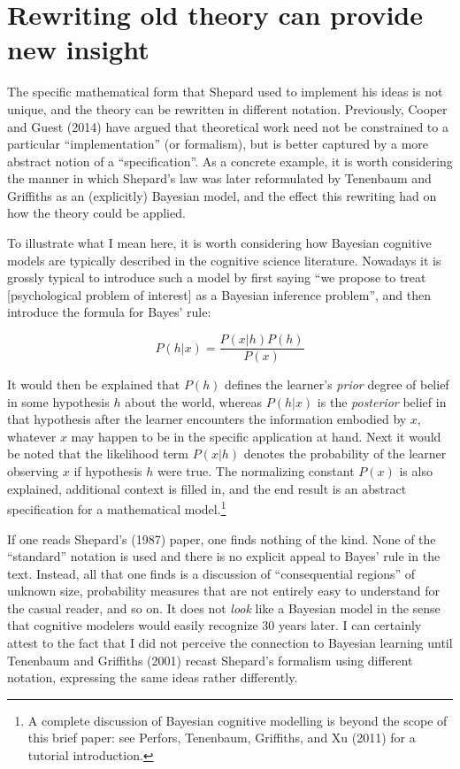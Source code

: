 \documentclass[
  english,
  doc]{apa6}
\begin{document}
\hypertarget{rewriting-old-theory-can-provide-new-insight}{%
\section{Rewriting old theory can provide new insight}\label{rewriting-old-theory-can-provide-new-insight}}

\noindent
The specific mathematical form that Shepard used to implement his ideas is not unique, and the theory can be rewritten in different notation. Previously, Cooper and Guest (2014) have argued that theoretical work need not be constrained to a particular \enquote{implementation} (or formalism), but is better captured by a more abstract notion of a \enquote{specification}. As a concrete example, it is worth considering the manner in which Shepard's law was later reformulated by Tenenbaum and Griffiths as an (explicitly) Bayesian model, and the effect this rewriting had on how the theory could be applied.

To illustrate what I mean here, it is worth considering how Bayesian cognitive models are typically described in the cognitive science literature. Nowadays it is grossly typical to introduce such a model by first saying \enquote{we propose to treat {[}psychological problem of interest{]} as a Bayesian inference problem}, and then introduce the formula for Bayes' rule:

\begin{equation}
P(h | x) = \frac{P(x | h) P(h)}{P(x)}
\end{equation}

\noindent
It would then be explained that \(P(h)\) defines the learner's \emph{prior} degree of belief in some hypothesis \(h\) about the world, whereas \(P(h|x)\) is the \emph{posterior} belief in that hypothesis after the learner encounters the information embodied by \(x\), whatever \(x\) may happen to be in the specific application at hand. Next it would be noted that the likelihood term \(P(x|h)\) denotes the probability of the learner observing \(x\) if hypothesis \(h\) were true. The normalizing constant \(P(x)\) is also explained, additional context is filled in, and the end result is an abstract specification for a mathematical model.\footnote{A complete discussion of Bayesian cognitive modelling is beyond the scope of this brief paper: see Perfors, Tenenbaum, Griffiths, and Xu (2011) for a tutorial introduction.}

If one reads Shepard's (1987) paper, one finds nothing of the kind. None of the \enquote{standard} notation is used and there is no explicit appeal to Bayes' rule in the text. Instead, all that one finds is a discussion of \enquote{consequential regions} of unknown size, probability measures that are not entirely easy to understand for the casual reader, and so on. It does not \emph{look} like a Bayesian model in the sense that cognitive modelers would easily recognize 30 years later. I can certainly attest to the fact that I did not perceive the connection to Bayesian learning until Tenenbaum and Griffiths (2001) recast Shepard's formalism using different notation, expressing the same ideas rather differently.
\end{document}
